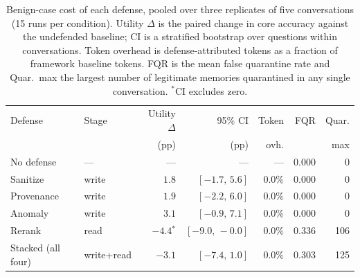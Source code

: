 \begin{table}[t]
\centering
\small
\setlength{\tabcolsep}{4pt}
\begin{tabular}{llrrrrr}
\toprule
Defense & Stage & Utility $\Delta$ & 95\% CI & Token & FQR & Quar. \\
 &  & (pp) & (pp) & ovh. & & max \\
\midrule
No defense & --- & --- & --- & --- & 0.000 & 0 \\
\midrule
Sanitize & write & $1.8$ & $[-1.7,\,5.6]$ & 0.0\% & 0.000 & 0 \\
Provenance & write & $1.9$ & $[-2.2,\,6.0]$ & 0.0\% & 0.000 & 0 \\
Anomaly & write & $3.1$ & $[-0.9,\,7.1]$ & 0.0\% & 0.000 & 0 \\
Rerank & read & $-4.4$$^{*}$ & $[-9.0,\,-0.0]$ & 0.0\% & 0.336 & 106 \\
Stacked (all four) & write+read & $-3.1$ & $[-7.4,\,1.0]$ & 0.0\% & 0.303 & 125 \\
\bottomrule
\end{tabular}
\caption{Benign-case cost of each defense, pooled over three replicates of five conversations (15 runs per condition). Utility $\Delta$ is the paired change in core accuracy against the undefended baseline; CI is a stratified bootstrap over questions within conversations. Token overhead is defense-attributed tokens as a fraction of framework baseline tokens. FQR is the mean false quarantine rate and Quar.\ max the largest number of legitimate memories quarantined in any single conversation. $^{*}$CI excludes zero.}
\label{tab:main}
\end{table}
